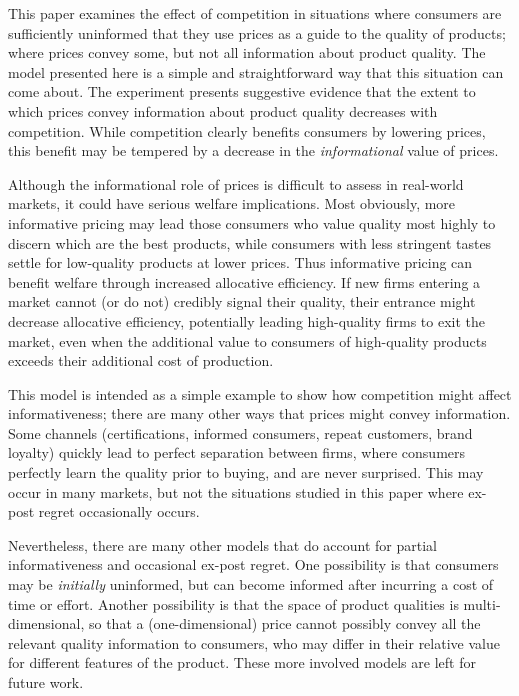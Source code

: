 \documentclass[12pt]{article}
\begin{document}
This paper examines the effect of competition in situations where consumers are sufficiently uninformed that they use prices as a guide to the quality of products; where prices convey some, but not all information about product quality. The model presented here is a simple and straightforward way that this situation can come about. The experiment presents suggestive evidence that the extent to which prices convey information about product quality decreases with competition. While competition clearly benefits consumers by lowering prices, this benefit may be tempered by a decrease in the \emph{informational} value of prices. 

Although the informational role of prices is difficult to assess in real-world markets, it could have serious welfare implications. Most obviously, more informative pricing may lead those consumers who value quality most highly to discern which are the best products, while consumers with less stringent tastes settle for low-quality products at lower prices. Thus informative pricing can benefit welfare through increased allocative efficiency. If new firms entering a market cannot (or do not) credibly signal their quality, their entrance might decrease allocative efficiency, potentially leading high-quality firms to exit the market, even when the additional value to consumers of high-quality products exceeds their additional cost of production.

This model is intended as a simple example to show how competition might affect informativeness; there are many other ways that prices might convey information. Some channels (certifications, informed consumers, repeat customers, brand loyalty) quickly lead to perfect separation between firms, where consumers perfectly learn the quality prior to buying, and are never surprised. This may occur in many markets, but not the situations studied in this paper where ex-post regret occasionally occurs. 

Nevertheless, there are many other models that do account for partial informativeness and occasional ex-post regret. One possibility is that consumers may be \emph{initially} uninformed, but can become informed after incurring a cost of time or effort. Another possibility is that the space of product qualities is multi-dimensional, so that a (one-dimensional) price cannot possibly convey all the relevant quality information to consumers, who may differ in their relative value for different features of the product. These more involved models are left for future work.
\end{document}
